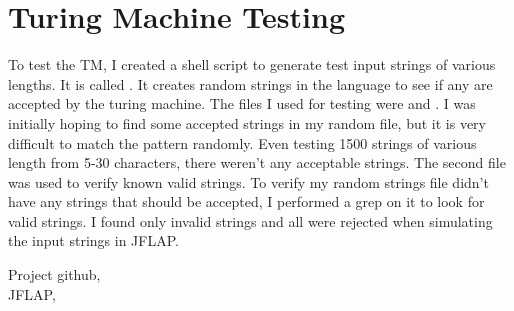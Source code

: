 \documentclass{article}
\begin{document}
\section{Turing Machine Testing}
To test the TM, I created a shell script to generate test input strings of various lengths. It is called . It creates random strings in the language to see if any are accepted by the turing machine. The files I used for testing were  and . I was initially hoping to find some accepted strings in my random file, but it is very difficult to match the pattern randomly. Even testing 1500 strings of various length from 5-30 characters, there weren't any acceptable strings. The second file  was used to verify known valid strings. To verify my random strings file didn't have any strings that should be accepted, I performed a grep on it to look for valid strings. I found only invalid strings and all were rejected when simulating the input strings in JFLAP.

\begin{thebibliography}{9}
Project github, \\
JFLAP, \\
\end{thebibliography}
\end{document}
